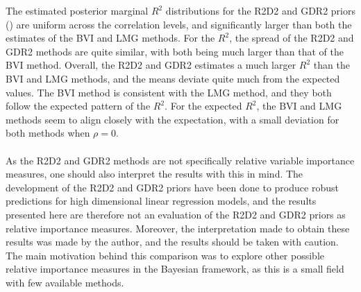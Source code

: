 \noindent The estimated posterior marginal $R^2$ distributions for the R2D2 and GDR2 priors () are uniform across the correlation levels, and significantly larger than both the estimates of the BVI and LMG methods. For the $R^2$, the spread of the R2D2 and GDR2 methods are quite similar, with both being much larger than that of the BVI method. Overall, the R2D2 and GDR2 estimates a much larger $R^2$ than the BVI and LMG methods, and the means deviate quite much from the expected values. The BVI method is consistent with the LMG method, and they both follow the expected pattern of the $R^2$. For the expected $R^2$, the BVI and LMG methods seem to align closely with the expectation, with a small deviation for both methods when $\rho=0$.
\\
\\
As the R2D2 and GDR2 methods are not specifically relative variable importance measures, one should also interpret the results with this in mind. The development of the R2D2 and GDR2 priors have been done to produce robust predictions for high dimensional linear regression models, and the results presented here are therefore not an evaluation of the R2D2 and GDR2 priors as relative importance measures. Moreover, the interpretation made to obtain these results was made by the author, and the results should be taken with caution. The main motivation behind this comparison was to explore other possible relative importance measures in the Bayesian framework, as this is a small field with few available methods. 




